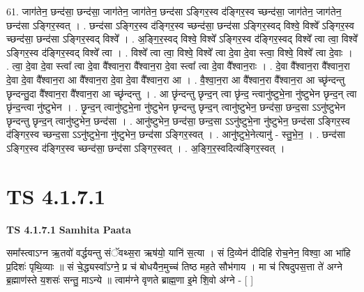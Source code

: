 \documentclass[17pt]{extarticle}
\begin{document}
61. जाग॑तेन॒ छन्द॑सा॒ छन्द॑सा॒ जाग॑तेन॒ जाग॑तेन॒ छन्द॑सा ऽङ्गिर॒स्व द॑ङ्गिर॒स्व च्छन्द॑सा॒ जाग॑तेन॒ जाग॑तेन॒ छन्द॑सा ऽङ्गिर॒स्वत् । . छन्द॑सा ऽङ्गिर॒स्व द॑ङ्गिर॒स्व च्छन्द॑सा॒ छन्द॑सा ऽङ्गिर॒स्वद् विश्वे॒ विश्वे᳚ ऽङ्गिर॒स्व च्छन्द॑सा॒ छन्द॑सा ऽङ्गिर॒स्वद् विश्वे᳚ । . अ॒ङ्गि॒र॒स्वद् विश्वे॒ विश्वे᳚ ऽङ्गिर॒स्व द॑ङ्गिर॒स्वद् विश्वे᳚ त्वा त्वा॒ विश्वे᳚ ऽङ्गिर॒स्व द॑ङ्गिर॒स्वद् विश्वे᳚ त्वा । . विश्वे᳚ त्वा त्वा॒ विश्वे॒ विश्वे᳚ त्वा दे॒वा दे॒वा स्त्वा॒ विश्वे॒ विश्वे᳚ त्वा दे॒वाः । . त्वा॒ दे॒वा दे॒वा स्त्वा᳚ त्वा दे॒वा वै᳚श्वान॒रा वै᳚श्वान॒रा दे॒वा स्त्वा᳚ त्वा दे॒वा वै᳚श्वान॒राः । . दे॒वा वै᳚श्वान॒रा वै᳚श्वान॒रा दे॒वा दे॒वा वै᳚श्वान॒रा आ वै᳚श्वान॒रा दे॒वा दे॒वा वै᳚श्वान॒रा आ । . वै॒श्वा॒न॒रा आ वै᳚श्वान॒रा वै᳚श्वान॒रा आ च्छृ॑न्दन्तु छृन्दन्तु॒दा वै᳚श्वान॒रा वै᳚श्वान॒रा आ च्छृ॑न्दन्तु । . आ छृ॑न्दन्तु छृन्द॒न् त्वा छृ॑न्द॒ न्त्वानु॑ष्टुभे॒ना नु॑ष्टुभेन छृन्द॒न् त्वा छृ॑न्द॒न्त्वा नु॑ष्टुभेन । . छृ॒न्द॒न् त्वानु॑ष्टुभे॒ना नु॑ष्टुभेन छृन्दन्तु छृन्द॒न् त्वानु॑ष्टुभेन॒ छन्द॑सा॒ छन्द॒सा ऽऽनु॑ष्टुभेन छृन्दन्तु छृन्द॒न् त्वानु॑ष्टुभेन॒ छन्द॑सा । . आनु॑ष्टुभेन॒ छन्द॑सा॒ छन्द॒सा ऽऽनु॑ष्टुभे॒ना नु॑ष्टुभेन॒ छन्द॑सा ऽङ्गिर॒स्व द॑ङ्गिर॒स्व च्छन्द॒सा ऽऽनु॑ष्टुभे॒ना नु॑ष्टुभेन॒ छन्द॑सा ऽङ्गिर॒स्वत् । . आनु॑ष्टुभे॒नेत्यानु॑ - स्तु॒भे॒न॒ । . छन्द॑सा ऽङ्गिर॒स्व द॑ङ्गिर॒स्व च्छन्द॑सा॒ छन्द॑सा ऽङ्गिर॒स्वत् । . अ॒ङ्गि॒र॒स्वदित्य॑ङ्गिर॒स्वत् । \newline
\pagebreak
{}

\section{ TS 4.1.7.1 }

\textbf{TS 4.1.7.1 } \newline
\textbf{Samhita Paata} \newline

समा᳚स्त्वाऽग्न ऋ॒तवो॑ वर्द्धयन्तु संॅवथ्स॒रा ऋष॑यो॒ यानि॑ स॒त्या । सं दि॒व्येन॑ दीदिहि रोच॒नेन॒ विश्वा॒ आ भा॑हि प्र॒दिशः॑ पृथि॒व्याः ॥ सं चे॒द्ध्यस्वा᳚ऽग्ने॒ प्र च॑ बोधयैन॒मुच्च॑ तिष्ठ मह॒ते सौभ॑गाय । मा च॑ रिषदुपस॒त्ता ते॑ अग्ने ब्र॒ह्माण॑स्ते य॒शसः॑ सन्तु॒ माऽन्ये ॥ त्वाम॑ग्ने वृणते ब्राह्म॒णा इ॒मे शि॒वो अ॑ग्ने - [  ] \newline
\end{document}
